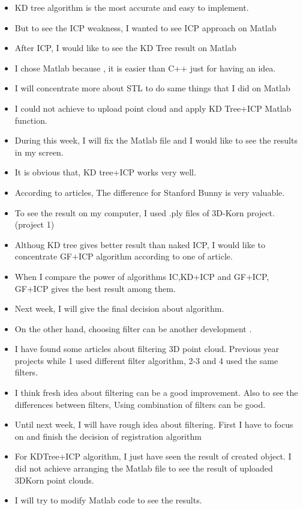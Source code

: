 \documentclass[aps,letterpaper,11pt]{revtex4}
\begin{document}
\begin{itemize}
\item KD tree algorithm is the most accurate and easy to implement.
\item But to see the ICP weakness, I wanted to see ICP approach on Matlab
\item After ICP, I would like to see the KD Tree result on Matlab
\item  I chose Matlab because , it is easier than C++ just for having an idea.
\item I will concentrate more about STL to do same things that I did on Matlab
\item I could not achieve to upload point cloud and apply KD Tree+ICP Matlab function.
\item During this week, I will fix the Matlab file and I would like to see the results in my screen.
\item It is obvious that, KD tree+ICP works very well.
\item  According to articles, The difference for Stanford Bunny is very valuable.
\item  To see the result on my computer, I used .ply files of 3D-Korn project. (project 1)
\item Althoug KD tree gives better result than naked ICP, I would like to concentrate GF+ICP algorithm according to one of article.
\item When I compare the power of algorithms IC,KD+ICP and GF+ICP, GF+ICP gives the best result among them.
\item  Next week, I will give the final decision about algorithm.
\item On the other hand, choosing filter can be another development .
\item I have found some articles about filtering 3D point cloud. Previous year projects while 1 used different filter algorithm, 2-3 and 4 used the same filters.
\item I think fresh idea about filtering can be a good improvement. Also to see the differences between filters, Using combination of filters can be good.
\item Until next week, I will have rough idea about filtering. First I have to focus on and finish the decision of registration algorithm
\item For KDTree+ICP algorithm, I just have seen the result of created object. I did not achieve arranging the Matlab file to see the result of uploaded 3DKorn point clouds.
\item I will try to modify Matlab code to see the results.
\end{itemize}
\end{document}
